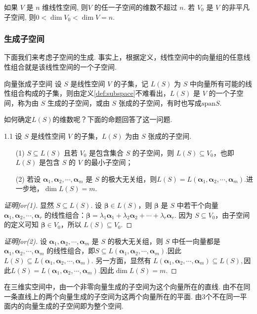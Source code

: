\documentclass[12pt, a4paper,newtx]{ctexart}
\begin{document}
如果 $V$ 是 $n$ 维线性空间, 则$V$ 的任一子空间的维数不超过 $n$. 若 $V_0$ 是 $V$ 的非平凡子空间, 则$0 < \dim V_0 < \dim V = n.$
\subsubsection{生成子空间}
下面我们来考虑子空间的生成. 事实上，根据定义，线性空间中的向量组的任意线性组合就是该线性空间的一个子空间. 
\begin{definition}{向量张成子空间}{}\kaishu 
	设 $S$ 是线性空间 $V$ 的子集，记 $L(S)$ 为 $S$ 中向量所有可能的线性组合构成的子集，则由定义\ref{def:subspace}不难看出，$L(S)$ 是 $V$ 的一个子空间，称为由 $S$ {\heiti 生成}的子空间，或由 $S$ {\heiti 张成}的子空间，有时也写成$\text{span}S.$
\end{definition}
如何确定$L(S)$的维数呢？下面的命题回答了这一问题. 
\begin{proposition}{}{1.1}
	设 $S$ 是线性空间 $V$ 的子集，$L(S)$ 为由 $S$ 张成的子空间.
	\begin{enumerate}
		\item[(1)] $S \subseteq L(S)$ 且若 $V_0$ 是包含集合 $S$ 的子空间，则 $L(S) \subseteq V_0$，也即 $L(S)$ 是包含 $S$ 的 $V$ 的最小子空间；
		\item[(2)] 若设 $\bm\alpha_1, \bm\alpha_2, \cdots, \bm\alpha_m$ 是 $S$ 的极大无关组，则$L(S) = L(\bm\alpha_1, \bm\alpha_2, \cdots, \bm\alpha_m).$进一步地，$\dim L(S)=m.$
	\end{enumerate}
\end{proposition}
\begin{proof}[证明for(1)]
	显然 $S \subseteq L(S)$. 设 $\bm\beta \in L(S)$，则 $\bm\beta$ 是 $S$ 中若干个向量 $\bm\alpha_1, \bm\alpha_2, \cdots, \bm\alpha_r$ 的线性组合：$
	\bm\beta = \lambda_1\bm\alpha_1 + \lambda_2\bm\alpha_2 + \cdots + \lambda_r\bm\alpha_r.$
	因为 $S \subseteq V_0$，由子空间的定义可知 $\bm\beta \in V_0$，所以 $L(S) \subseteq V_0$. 
\end{proof}
\begin{proof}[证明for(2)]
	设 $\bm\alpha_1, \bm\alpha_2, \cdots, \bm\alpha_m$ 是 $S$ 的极大无关组，则 $S$ 中任一向量都是 $\bm\alpha_1, \bm\alpha_2, \cdots, \bm\alpha_m$ 的线性组合，即$S \subseteq L(\bm\alpha_1, \bm\alpha_2, \cdots, \bm\alpha_m).$因此$
	L(S) \subseteq L(\bm\alpha_1, \bm\alpha_2, \cdots, \bm\alpha_m).$
	另一方面，显然有
	$L(\bm\alpha_1, \bm\alpha_2, \cdots, \bm\alpha_m) \subseteq L(S),$因此$L(S) = L(\bm\alpha_1, \bm\alpha_2, \cdots, \bm\alpha_m). $因此$\dim L(S)=m.$ 
\end{proof}
\begin{example}{}{}
	在三维实空间中，由一个非零向量生成的子空间为这个向量所在的直线. 由不在同一条直线上的两个向量生成的子空间为这两个向量所在的平面. 由3个不在同一平面内的向量生成的子空间即为整个空间. 
\end{example}
\end{document}
